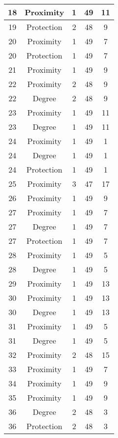 \documentclass[results.tex]{subfiles}
\begin{document}
\begin{center}
\begin{tabular}{| c || c | c | c | c |}
    \hline
    18 & Proximity & 1 & 49 & 11 \\ 
    \hline
    19 & Protection & 2 & 48 & 9 \\ 
    \hline
    20 & Proximity & 1 & 49 & 7 \\ 
    \hline
    20 & Protection & 1 & 49 & 7 \\ 
    \hline
    21 & Proximity & 1 & 49 & 9 \\ 
    \hline
    22 & Proximity & 2 & 48 & 9 \\ 
    \hline
    22 & Degree & 2 & 48 & 9 \\ 
    \hline
    23 & Proximity & 1 & 49 & 11 \\ 
    \hline
    23 & Degree & 1 & 49 & 11 \\ 
    \hline
    24 & Proximity & 1 & 49 & 1 \\ 
    \hline
    24 & Degree & 1 & 49 & 1 \\ 
    \hline
    24 & Protection & 1 & 49 & 1 \\ 
    \hline
    25 & Proximity & 3 & 47 & 17 \\ 
    \hline
    26 & Proximity & 1 & 49 & 9 \\ 
    \hline
    27 & Proximity & 1 & 49 & 7 \\ 
    \hline
    27 & Degree & 1 & 49 & 7 \\ 
    \hline
    27 & Protection & 1 & 49 & 7 \\ 
    \hline
    28 & Proximity & 1 & 49 & 5 \\ 
    \hline
    28 & Degree & 1 & 49 & 5 \\ 
    \hline
    29 & Proximity & 1 & 49 & 13 \\ 
    \hline
    30 & Proximity & 1 & 49 & 13 \\ 
    \hline
    30 & Degree & 1 & 49 & 13 \\ 
    \hline
    31 & Proximity & 1 & 49 & 5 \\ 
    \hline
    31 & Degree & 1 & 49 & 5 \\ 
    \hline
    32 & Proximity & 2 & 48 & 15 \\ 
    \hline
    33 & Proximity & 1 & 49 & 7 \\ 
    \hline
    34 & Proximity & 1 & 49 & 9 \\ 
    \hline
    35 & Proximity & 1 & 49 & 9 \\ 
    \hline
    36 & Degree & 2 & 48 & 3 \\ 
    \hline
    36 & Protection & 2 & 48 & 3 \\ 
    \hline

\end{tabular}
\end{center}
\end{document}
